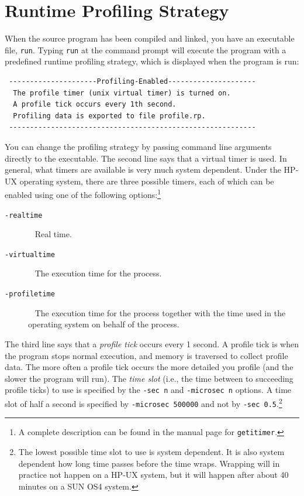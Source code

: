 \documentclass[12pt]{book}
\begin{document}
\section{Runtime Profiling Strategy}
When the source program has been compiled and linked, you have an
executable file, \texttt{run}. Typing \texttt{run} at the command prompt will
execute the program with a predefined 
%
runtime profiling strategy, which is displayed when the program is
run:
\begin{verbatim}
 ---------------------Profiling-Enabled---------------------
  The profile timer (unix virtual timer) is turned on.
  A profile tick occurs every 1th second.
  Profiling data is exported to file profile.rp.
 -----------------------------------------------------------
\end{verbatim}
You can change the 
%
profiling strategy by passing command line arguments directly to the
executable.  The second line says that a virtual timer is used. In general, what timers are available
  is very much system dependent. Under the HP-UX operating system, there
are three possible timers, each of which can be enabled using one of
the following options:\footnote{A complete description can be
    found in the manual page for \texttt{getitimer}.}
\begin{description}
\item[{\tt -realtime}]~
  Real time.
\item[{\tt -virtualtime}]~ 
  The execution time for the process.
\item[{\tt -profiletime}]~
  The execution time for the process together with the time used in
  the operating system on behalf of the process.
\end{description}

The third line says that a 
%
{\em profile tick\/} occurs every 1 second.  A profile tick is when
the program stops normal execution, and memory is traversed to collect
profile data. The more often a profile tick occurs the more detailed
you profile (and the slower the program will run). The
%
{\em time slot\/} (i.e., the time between to succeeding profile ticks) to use
is specified by the 
%
\texttt{-sec n} and 
%
\texttt{-microsec n} options. A time slot of half a second is
specified by \texttt{-microsec 500000} and not by \texttt{-sec
  0.5}.\footnote{The lowest possible time slot to use is system
  dependent. It is also system dependent how long time passes
  before the time wraps.  Wrapping will in practice not happen on a HP-UX system,
  but it will happen after about 40 minutes on a SUN OS4 system.}
\end{document}

